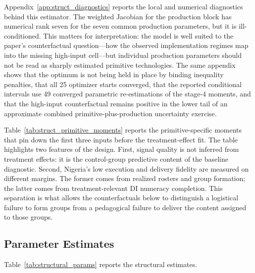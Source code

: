 \documentclass[11pt]{article}
\begin{document}


Appendix~\ref{app:struct_diagnostics} reports the local and numerical diagnostics behind this estimator. The weighted Jacobian for the production block has numerical rank seven for the seven common production parameters, but it is ill-conditioned. This matters for interpretation: the model is well suited to the paper's counterfactual question---how the observed implementation regimes map into the missing high-input cell---but individual production parameters should not be read as sharply estimated primitive technologies. The same appendix shows that the optimum is not being held in place by binding inequality penalties, that all 25 optimizer starts converged, that the reported conditional intervals use 49 converged parametric re-estimations of the stage-4 moments, and that the high-input counterfactual remains positive in the lower tail of an approximate combined primitive-plus-production uncertainty exercise.

Table~\ref{tab:struct_primitive_moments} reports the primitive-specific moments that pin down the first three inputs before the treatment-effect fit. The table highlights two features of the design. First, signal quality is not inferred from treatment effects: it is the control-group predictive content of the baseline diagnostic. Second, Nigeria's low execution and delivery fidelity are measured on different margins. The former comes from realized rosters and group formation; the latter comes from treatment-relevant DI numeracy completion. This separation is what allows the counterfactuals below to distinguish a logistical failure to form groups from a pedagogical failure to deliver the content assigned to those groups.



\subsection{Parameter Estimates}
\label{subsec:struct_estimates}

Table~\ref{tab:structural_params} reports the structural estimates.


\end{document}
